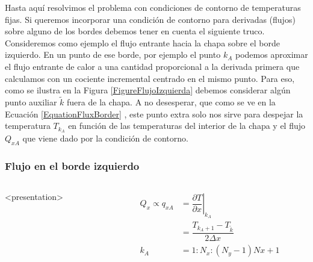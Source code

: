 
Hasta aquí resolvimos el problema con condiciones de contorno de 
temperaturas fijas. Si queremos incorporar una condición de 
contorno para derivadas (flujos) sobre alguno de los bordes
debemos tener en cuenta el siguiente truco. Consideremos como 
ejemplo el flujo entrante hacia la chapa sobre el borde 
izquierdo. En un punto de ese borde, por ejemplo el punto $k_A$ 
podemos aproximar el flujo entrante
de calor a una cantidad proporcional a la derivada primera que calculamos
con un cociente incremental centrado en el mismo punto. Para eso, como 
se ilustra en la Figura \ref{FigureFlujoIzquierda} debemos considerar 
algún punto auxiliar $\tilde{k}$ fuera de la chapa. A no desesperar,
que como se ve en la Ecuación \ref{EquationFluxBorder} , este 
punto extra solo nos sirve para despejar la temperatura
$ T_{k_A}  $ en función de las temperaturas del interior 
de la chapa y el flujo $Q_{xA}$ que viene dado por la
condición de contorno. 


\mode*

%
%

\begin{frame}[label=FrameFlujoIzquierda]
  \frametitle<presentation>{Flujo en el borde izquierdo}

  \center

  \begin{columns}<presentation>
    \begin{figure}
    \end{figure}
    \begin{equation}\label{EquationFluxBorder}
      \begin{aligned}
      Q_x \propto q_{xA} 
	& = \left. \dfrac{ \partial T } {\partial x} \right \vert _{k_A} 
	\\
	& = \dfrac{ T_{k_A + 1} - T_{ \tilde{k} } }{ 2 \Delta x }
      \\
	k_A & = 1 : N_x : (N_y - 1) Nx+1
      \end{aligned}
    \end{equation}


  \end{columns}

\end{frame}

